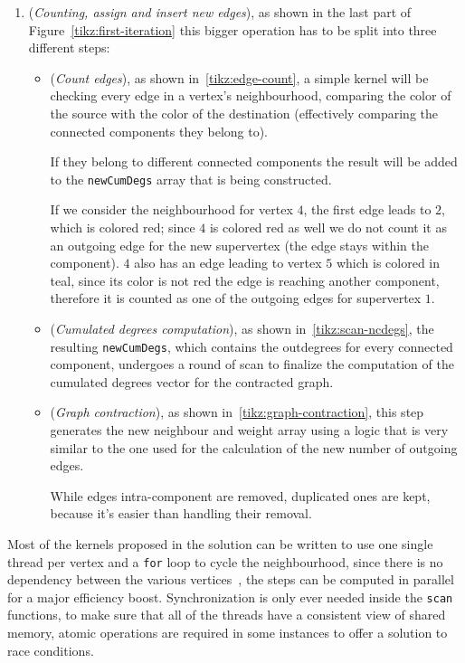 \documentclass[a4paper,10pt]{article}
\begin{document}
\begin{enumerate}
	      Since during the previous step the algorithm recursively looks for the root of the
	      component we can easily merge the two steps together to have a reduction of the
	      kernel launch overhead.
	\item\label{item:graph-contraction} (\textit{Counting, assign and insert new edges}), as shown in the last part of Figure~\ref{tikz:first-iteration} this bigger operation has to be split into three different steps:
	      \begin{itemize}
		      \item\label{item:count-edges} (\textit{Count edges}), as shown in~\ref{tikz:edge-count}, a simple kernel will be checking every edge in a vertex's neighbourhood, comparing the color of the source with the color of the destination (effectively comparing the connected components they belong to).

		            If they belong to different connected components the result will be added to the \texttt{newCumDegs} array that is being constructed.

		            If we consider the neighbourhood for vertex $4$, the first edge leads to
		            $2$, which is colored red; since $4$ is colored red as well we do not count
		            it as an outgoing edge for the new supervertex (the edge stays within the
		            component). $4$ also has an edge leading to vertex $5$ which is colored in
		            teal, since its color is not red the edge is reaching another component,
		            therefore it is counted as one of the outgoing edges for supervertex $1$.
		      \item\label{item:scan-ncd} (\textit{Cumulated degrees computation}), as shown in~\ref{tikz:scan-ncdegs}, the resulting \texttt{newCumDegs}, which contains the outdegrees for every connected component, undergoes a round of scan to finalize the computation of the cumulated degrees vector for the contracted graph.
		      \item\label{item:graph-regen} (\textit{Graph contraction}), as shown in~\ref{tikz:graph-contraction}, this step generates the new neighbour and weight array using a logic that is very similar to the one used for the calculation of the new number of outgoing edges.

		            While edges intra-component are removed, duplicated ones are kept, because it's easier than handling their removal.
	      \end{itemize}
\end{enumerate}
Most of the kernels proposed in the solution can be written to use one single thread per vertex and a \texttt{for} loop to cycle the neighbourhood, since there is no dependency between the various vertices~\cite{generic-he-boruvka}, the steps can be computed in parallel for a major efficiency boost. Synchronization is only ever needed inside the \texttt{scan} functions, to make sure that all of the threads have a consistent view of shared memory, atomic operations are required in some instances to offer a solution to race conditions.
\end{document}
